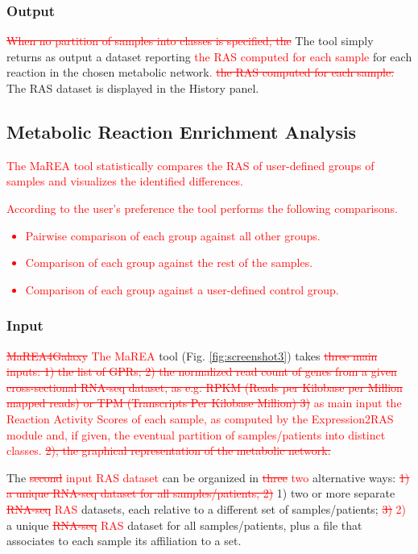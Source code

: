 \documentclass[preprint,12pt,authoryear]{elsarticle}
\newcommand{\red}{\textcolor{red}}
\newcommand{\mareagalaxy}{\textsf{MaREA4Galaxy}}
\newcommand{\mareaTool}{\textsf{MaREA}}
\newcommand{\RASTool}{\textsf{Expression2RAS}}
\begin{document}
\subsubsection{Output}

\red{\sout{When no partition of samples into classes is specified,
    the}} The tool simply returns as output a dataset reporting
\red{the RAS computed for each sample} for each reaction in the chosen
metabolic network\red{. \sout{the RAS computed for each sample.}} The
RAS dataset is displayed in the History panel.


\subsection{Metabolic Reaction Enrichment Analysis}

\red{The \mareaTool{} tool statistically compares the RAS of
  user-defined groups of samples \citep{marea} and visualizes the
  identified differences.}

\red{According to the user's preference the tool performs the
  following comparisons.
  \begin{itemize}
  \item Pairwise comparison of each group against all other groups.
  \item Comparison of each group against the rest of the samples.
  \item Comparison of each group against a user-defined control group.
  \end{itemize}}


\subsubsection{Input}

\red{\sout{\mareagalaxy} The \mareaTool{}} tool
(Fig. \ref{fig:screenshot3}) takes \red{\sout{three main inputs: 1)
    the list of GPRs; 2) the normalized read count of genes from a
    given cross-sectional RNA-seq dataset, as e.g. RPKM (Reads per
    Kilobase per Million mapped reads) or TPM (Transcripts Per
    Kilobase Million) 3)} as main input the Reaction Activity Scores
  of each sample, as computed by the \RASTool{} module and\red{, if
    given,} the eventual partition of samples/patients into distinct
  classes. \sout{2); the graphical representation of the metabolic
    network.}}

The \red{\sout{second} input RAS dataset} can be organized in
\red{\sout{three} two} alternative ways: \red{\sout{1) a unique
    RNA-seq  dataset for all samples/patients; 2)}} 1) two or more
separate \red{\sout{RNA-seq} RAS} datasets, each relative to a
different set of samples/patients; \red{\sout{3)} 2)} a unique
\red{\sout{RNA-seq} RAS} dataset for all samples/patients, plus a file
that associates to each sample its affiliation to a set.
\end{document}
